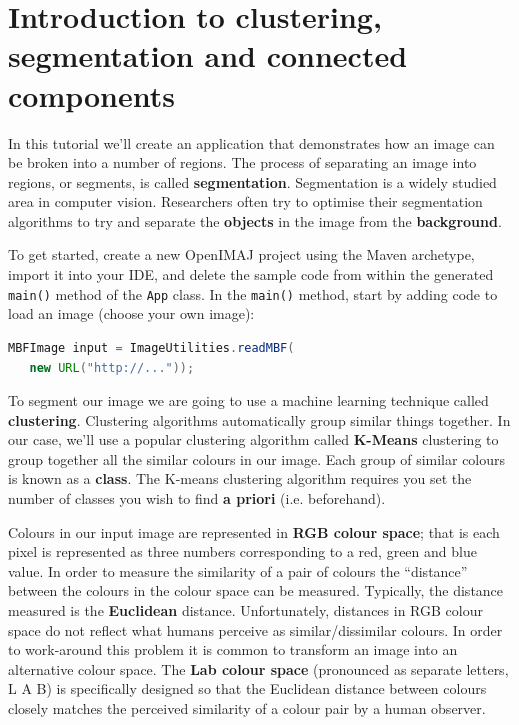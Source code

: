 \chapter{Introduction to clustering, segmentation and connected components}
In this tutorial we'll create an application that demonstrates how an image can be 
broken into a number of regions. The process of separating an image into regions, 
or segments, is called \textbf{segmentation}. Segmentation is a widely studied area in 
computer vision. Researchers often try to optimise their segmentation algorithms 
to try and separate the \textbf{objects} in the image from the \textbf{background}.

To get started, create a new OpenIMAJ project using the Maven archetype, 
import it into your IDE, and delete the sample code from within the generated 
\verb+main()+ method of the \verb+App+ class. In the \verb+main()+ method, 
start by adding code to load an image (choose your own image):
\begin{lstlisting}[language=java]
MBFImage input = ImageUtilities.readMBF(
   new URL("http://..."));
\end{lstlisting}

To segment our image we are going to use a machine 
learning technique called 
\textbf{clustering}. Clustering algorithms automatically group similar things together. In our 
case, we'll use a popular clustering algorithm called \textbf{K-Means} clustering to group 
together all the similar colours in our image. Each group of similar colours is 
known as a \textbf{class}. The K-means clustering algorithm requires you set the number 
of classes you wish to find \textbf{a priori} (i.e. beforehand). 

Colours in our input image are represented in \textbf{RGB colour space}; that is each pixel is 
represented as three numbers corresponding to a red, green and blue value. In order 
to measure the similarity of a pair of colours the ``distance'' between the colours in 
the colour space can be measured.  Typically, the distance measured is the \textbf{Euclidean} 
distance. Unfortunately, distances in RGB colour space do not reflect what humans perceive as 
similar/dissimilar colours. In order to work-around this problem it is common to transform 
an image into an alternative colour space. The \textbf{Lab colour space} (pronounced as 
separate letters, L A B) is specifically designed so that the Euclidean distance between 
colours closely matches the perceived similarity of a colour pair by a human observer.

